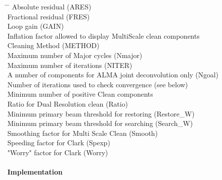\begin{tabbing}
\hspace{0.2cm} \= \hspace{4.2cm} \= \kill
\>   \>  Absolute residual  (ARES) \\
\>   \>  Fractional residual (FRES) \\
\>   \>  Loop gain  (GAIN) \\
\>  \> Inflation factor allowed to display MultiScale clean components \\
\>  \>  Cleaning Method  (METHOD) \\
\>  \>  Maximum number of Major cycles (Nmajor) \\
\>  \>  Maximum number of iterations (NITER) \\
\>  \> A number of components for ALMA joint deconvolution only (Ngoal)\\
\>  \>  Number of iterations used to check convergence (see below)\\
\>  \> Minimum number of positive Clean components \\
\>  \> Ratio for  Dual Resolution clean (Ratio) \\
\>  \>  Minimum primary beam threshold for restoring  (Restore\_W) \\
\>  \>  Minimum primary beam threshold for searching (Search\_W) \\
\>  \> Smoothing factor for Multi Scale Clean (Smooth) \\
\>  \> Speeding factor for Clark (Spexp) \\
\>  \> "Worry" factor for Clark (Worry) \\
\end{tabbing}


\paragraph{Implementation}

